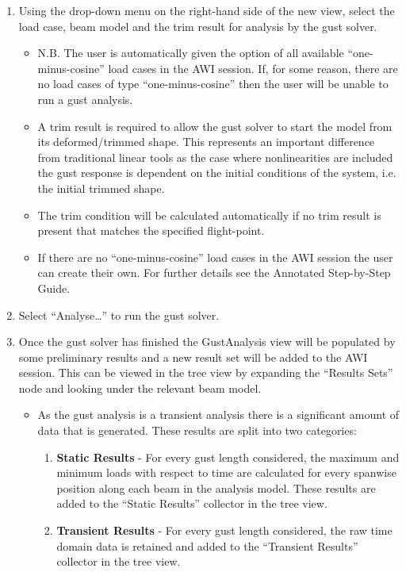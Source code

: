 \begin{enumerate}
\begin{enumerate}
\begin{enumerate}
			\item Using the drop-down menu on the right-hand side of the new view, select the load case, beam model and the trim result for analysis by the gust solver.
			\begin{itemize}
				\item N.B. The user is automatically given the option of all available ``one-minus-cosine'' load cases in the AWI session. If, for some reason, there are no load cases of type ``one-minus-cosine'' then the user will be unable to run a gust analysis.
				\item A trim result is required to allow the gust solver to start the model from its deformed/trimmed shape. This represents an important difference from traditional linear tools as the case where nonlinearities are included the gust response is dependent on the initial conditions of the system, i.e. the initial trimmed shape.
				\item The trim condition will be calculated automatically if no trim result is present that matches the specified flight-point.
				\item If there are no ``one-minus-cosine'' load cases in the AWI session the user can create their own. For further details see the Annotated Step-by-Step Guide.
			\end{itemize}
			\item Select ``Analyse…'' to run the gust solver.
			\item Once the gust solver has finished the GustAnalysis view will be populated by some preliminary results and a new result set will be added to the AWI session.  This can be viewed in the tree view by expanding the ``Results Sets'' node and looking under the relevant beam model.
			\begin{itemize}
				\item As the gust analysis is a transient analysis there is a significant amount of data that is generated. These results are split into two categories:
				\begin{enumerate}
					\item \textbf{Static Results} - For every gust length considered, the maximum and minimum loads with respect to time are calculated for every spanwise position along each beam in the analysis model. These results are added to the ``Static Results'' collector in the tree view.				
					\item \textbf{Transient Results} - For every gust length considered, the raw time domain data is retained and added to the ``Transient Results'' collector in the tree view.

\end{enumerate}
\end{itemize}
\end{enumerate}
\end{enumerate}
\end{enumerate}
